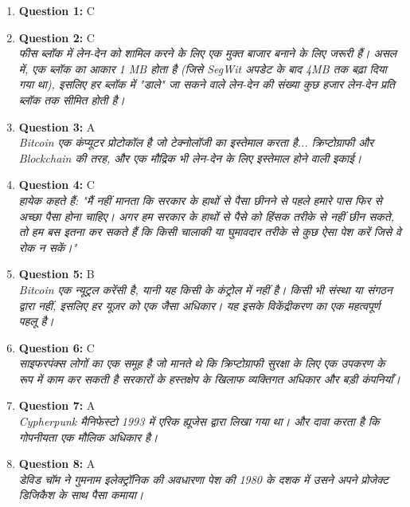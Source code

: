 \documentclass[12pt,a4paper]{article}
\begin{document}
\begin{enumerate}
\item \textbf{Question 1:} C

\item \textbf{Question 2:} C
\\ \textit{फीस ब्लॉक में लेन-देन को शामिल करने के लिए एक मुक्त बाजार बनाने के लिए जरूरी हैं। असल में, एक ब्लॉक का आकार 1 MB होता है (जिसे SegWit अपडेट के बाद 4MB तक बढ़ा दिया गया था), इसलिए हर ब्लॉक में "डाले" जा सकने वाले लेन-देन की संख्या कुछ हजार लेन-देन प्रति ब्लॉक तक सीमित होती है।}

\item \textbf{Question 3:} A
\\ \textit{Bitcoin एक कंप्यूटर प्रोटोकॉल है जो टेक्नोलॉजी का इस्तेमाल करता है... क्रिप्टोग्राफी और Blockchain की तरह, और एक मौद्रिक भी लेन-देन के लिए इस्तेमाल होने वाली इकाई।}

\item \textbf{Question 4:} C
\\ \textit{हायेक कहते हैं: "मैं नहीं मानता कि सरकार के हाथों से पैसा छीनने से पहले हमारे पास फिर से अच्छा पैसा होना चाहिए। अगर हम सरकार के हाथों से पैसे को हिंसक तरीके से नहीं छीन सकते, तो हम बस इतना कर सकते हैं कि किसी चालाकी या घुमावदार तरीके से कुछ ऐसा पेश करें जिसे वे रोक न सकें।"}

\item \textbf{Question 5:} B
\\ \textit{Bitcoin एक न्यूट्रल करेंसी है, यानी यह किसी के कंट्रोल में नहीं है। किसी भी संस्था या संगठन द्वारा नहीं, इसलिए हर यूज़र को एक जैसा अधिकार। यह इसके विकेंद्रीकरण का एक महत्वपूर्ण पहलू है।}

\item \textbf{Question 6:} C
\\ \textit{साइफरपंक्स लोगों का एक समूह है जो मानते थे कि क्रिप्टोग्राफी सुरक्षा के लिए एक उपकरण के रूप में काम कर सकती है सरकारों के हस्तक्षेप के खिलाफ व्यक्तिगत अधिकार और बड़ी कंपनियाँ।}

\item \textbf{Question 7:} A
\\ \textit{Cypherpunk मैनिफेस्टो 1993 में एरिक ह्यूजेस द्वारा लिखा गया था। और दावा करता है कि गोपनीयता एक मौलिक अधिकार है।}

\item \textbf{Question 8:} A
\\ \textit{डेविड चॉम ने गुमनाम इलेक्ट्रॉनिक की अवधारणा पेश की 1980 के दशक में उसने अपने प्रोजेक्ट डिजिकैश के साथ पैसा कमाया।}


\end{enumerate}
\end{document}
